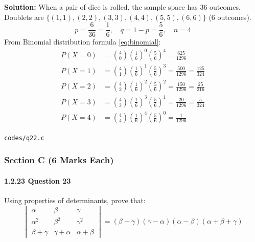 \documentclass{article}
\begin{document}
\textbf{Solution:} When a pair of dice is rolled, the sample space has $36$ outcomes. Doublets are $\{(1,1),(2,2),(3,3),(4,4),(5,5),(6,6)\}$ (6 outcomes).
\begin{equation}
p = \frac{6}{36} = \frac{1}{6}, \quad q = 1 - p = \frac{5}{6}, \quad n = 4
\end{equation}
From Binomial distribution formula \eqref{eq:binomial}:
\begin{align}
P(X = 0) &= \binom{4}{0}\left(\frac{1}{6}\right)^0\left(\frac{5}{6}\right)^4 = \frac{625}{1296} \\
P(X = 1) &= \binom{4}{1}\left(\frac{1}{6}\right)^1\left(\frac{5}{6}\right)^3 = \frac{500}{1296} = \frac{125}{324} \\
P(X = 2) &= \binom{4}{2}\left(\frac{1}{6}\right)^2\left(\frac{5}{6}\right)^2 = \frac{150}{1296} = \frac{25}{216} \\
P(X = 3) &= \binom{4}{3}\left(\frac{1}{6}\right)^3\left(\frac{5}{6}\right)^1 = \frac{20}{1296} = \frac{5}{324} \\
P(X = 4) &= \binom{4}{4}\left(\frac{1}{6}\right)^4\left(\frac{5}{6}\right)^0 = \frac{1}{1296}
\end{align}
\begin{tcolorbox}[colback=gray!10,colframe=black,width=\linewidth]
\texttt{codes/q22.c}
\end{tcolorbox}

\newpage
\subsubsection*{Section C (6 Marks Each)}

\paragraph{1.2.23 Question 23}
Using properties of determinants, prove that:
\begin{equation}
\begin{vmatrix} \alpha & \beta & \gamma \\ \alpha^2 & \beta^2 & \gamma^2 \\ \beta+\gamma & \gamma+\alpha & \alpha+\beta \end{vmatrix} = (\beta - \gamma)(\gamma - \alpha)(\alpha - \beta)(\alpha + \beta + \gamma)
\end{equation}
\end{document}
